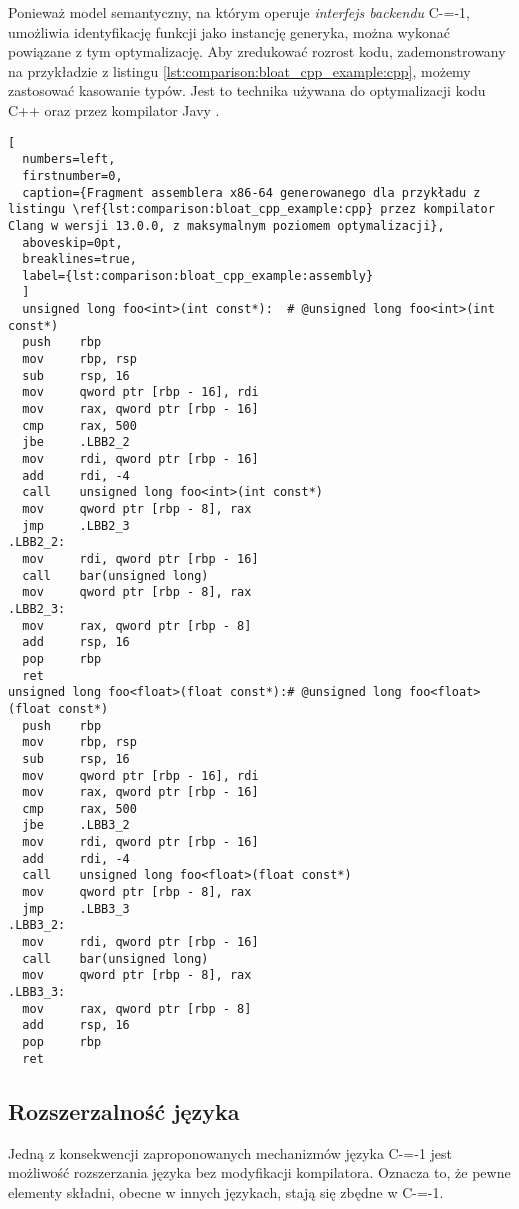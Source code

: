 Ponieważ model semantyczny, na którym operuje \emph{interfejs backendu} C-=-1, umożliwia identyfikację funkcji jako instancję generyka, można wykonać powiązane z tym optymalizację.
Aby zredukować rozrost kodu, zademonstrowany na przykładzie z listingu \ref{lst:comparison:bloat_cpp_example:cpp}, możemy zastosować kasowanie typów.
Jest to technika używana do optymalizacji kodu C++ \cite{becker2007:type_erasure} oraz przez kompilator Javy \cite{nino2007:cost_type_erasure_java}.

\begin{lstlisting}[
  numbers=left,
  firstnumber=0,
  caption={Fragment assemblera x86-64 generowanego dla przykładu z listingu \ref{lst:comparison:bloat_cpp_example:cpp} przez kompilator Clang w wersji 13.0.0, z maksymalnym poziomem optymalizacji},
  aboveskip=0pt,
  breaklines=true,
  label={lst:comparison:bloat_cpp_example:assembly}
  ]
  unsigned long foo<int>(int const*):  # @unsigned long foo<int>(int const*)
  push    rbp
  mov     rbp, rsp
  sub     rsp, 16
  mov     qword ptr [rbp - 16], rdi
  mov     rax, qword ptr [rbp - 16]
  cmp     rax, 500
  jbe     .LBB2_2
  mov     rdi, qword ptr [rbp - 16]
  add     rdi, -4
  call    unsigned long foo<int>(int const*)
  mov     qword ptr [rbp - 8], rax
  jmp     .LBB2_3
.LBB2_2:
  mov     rdi, qword ptr [rbp - 16]
  call    bar(unsigned long)
  mov     qword ptr [rbp - 8], rax
.LBB2_3:
  mov     rax, qword ptr [rbp - 8]
  add     rsp, 16
  pop     rbp
  ret
unsigned long foo<float>(float const*):# @unsigned long foo<float>(float const*)
  push    rbp
  mov     rbp, rsp
  sub     rsp, 16
  mov     qword ptr [rbp - 16], rdi
  mov     rax, qword ptr [rbp - 16]
  cmp     rax, 500
  jbe     .LBB3_2
  mov     rdi, qword ptr [rbp - 16]
  add     rdi, -4
  call    unsigned long foo<float>(float const*)
  mov     qword ptr [rbp - 8], rax
  jmp     .LBB3_3
.LBB3_2:
  mov     rdi, qword ptr [rbp - 16]
  call    bar(unsigned long)
  mov     qword ptr [rbp - 8], rax
.LBB3_3:
  mov     rax, qword ptr [rbp - 8]
  add     rsp, 16
  pop     rbp
  ret
\end{lstlisting}


\subsection{Rozszerzalność języka}
\label{Language_extensibility}
Jedną z konsekwencji zaproponowanych mechanizmów języka C-=-1 jest możliwość rozszerzania języka bez modyfikacji kompilatora.
Oznacza to, że pewne elementy składni, obecne w innych językach, stają się zbędne w C-=-1.

